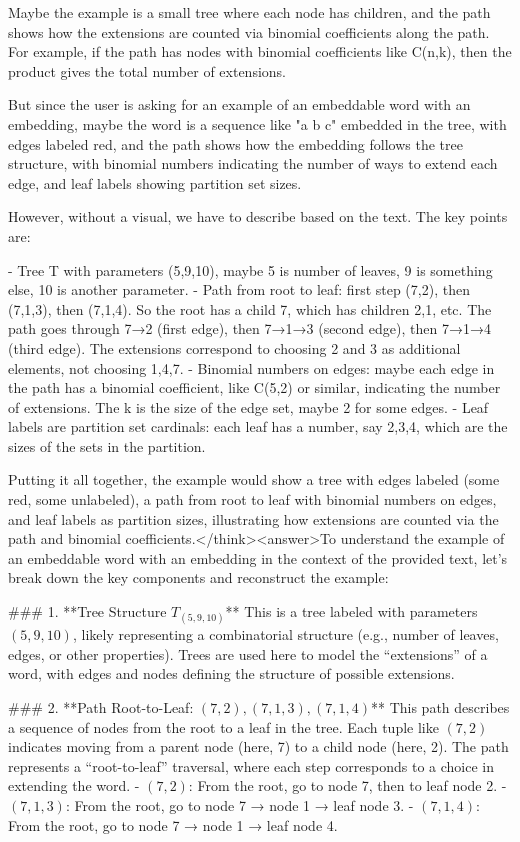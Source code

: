 Maybe the example is a small tree where each node has children, and the path shows how the extensions are counted via binomial coefficients along the path. For example, if the path has nodes with binomial coefficients like C(n,k), then the product gives the total number of extensions.

But since the user is asking for an example of an embeddable word with an embedding, maybe the word is a sequence like "a b c" embedded in the tree, with edges labeled red, and the path shows how the embedding follows the tree structure, with binomial numbers indicating the number of ways to extend each edge, and leaf labels showing partition set sizes.

However, without a visual, we have to describe based on the text. The key points are:

- Tree T with parameters (5,9,10), maybe 5 is number of leaves, 9 is something else, 10 is another parameter.
- Path from root to leaf: first step (7,2), then (7,1,3), then (7,1,4). So the root has a child 7, which has children 2,1, etc. The path goes through 7→2 (first edge), then 7→1→3 (second edge), then 7→1→4 (third edge). The extensions correspond to choosing 2 and 3 as additional elements, not choosing 1,4,7.
- Binomial numbers on edges: maybe each edge in the path has a binomial coefficient, like C(5,2) or similar, indicating the number of extensions. The k is the size of the edge set, maybe 2 for some edges.
- Leaf labels are partition set cardinals: each leaf has a number, say 2,3,4, which are the sizes of the sets in the partition.

Putting it all together, the example would show a tree with edges labeled (some red, some unlabeled), a path from root to leaf with binomial numbers on edges, and leaf labels as partition sizes, illustrating how extensions are counted via the path and binomial coefficients.</think><answer>To understand the example of an embeddable word with an embedding in the context of the provided text, let’s break down the key components and reconstruct the example:  


### 1. **Tree Structure \( T_{(5,9,10)} \)**  
This is a tree labeled with parameters \( (5,9,10) \), likely representing a combinatorial structure (e.g., number of leaves, edges, or other properties). Trees are used here to model the “extensions” of a word, with edges and nodes defining the structure of possible extensions.  


### 2. **Path Root-to-Leaf: \( (7,2),(7,1,3),(7,1,4) \)**  
This path describes a sequence of nodes from the root to a leaf in the tree. Each tuple like \( (7,2) \) indicates moving from a parent node (here, 7) to a child node (here, 2). The path represents a “root-to-leaf” traversal, where each step corresponds to a choice in extending the word.  
- \( (7,2) \): From the root, go to node 7, then to leaf node 2.  
- \( (7,1,3) \): From the root, go to node 7 → node 1 → leaf node 3.  
- \( (7,1,4) \): From the root, go to node 7 → node 1 → leaf node 4.  

